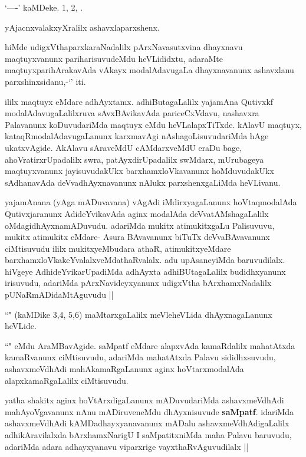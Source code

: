 \begin{artha}
`\stext----' kaMDeke. 1, 2, \stext.

yAjacnxvalakxyXralilx ashavxlaparxshenx.

hiMde udigxVthaparxkaraNadalilx pArxNavasutxvina dhayxnavu maqtuyxvanunx 
pariharisuvudeMdu heVLididxtu, adaraMte maqtuyxparihArakavAda vAkayx modalAdavugaLa 
dhayxnavanunx ashavxlanu parxshinxsidanu,-`\stext' iti.

ililx maqtuyx eMdare adhAyxtamx. adhiButagaLalilx yajamAna Qutivxkf 
modalAdavugaLalilxruva sAvxBAvikavAda pariceCxVdavu, nashavxra Palavanunx koDuvudariMda 
maqtuyx eMdu heVLalapxTiTxde. kAlavU maqtuyx, kataqRmodalAdavugaLanunx karxmavAgi 
nAshagoLisuvudariMda hAge ukatxvAgide. AkAlavu sAraveMdU cAMdarxveMdU eraDu bage, 
ahoVratirxrUpadalilx swra, patAyxdirUpadalilx swMdarx, mUrubageya maqtuyxvanunx 
jayisuvudakUkx barxhamxloVkavanunx hoMduvudakUkx sAdhanavAda deVvadhAyxnavanunx nAlukx 
parxshenxgaLiMda heVLivanu.
\end{artha}

\begin{center}
\end{center}

\begin{artha}
yajamAnana (yAga mADuvavana) vAgAdi iMdirxyagaLanunx hoVtaqmodalAda Qutivxjaranunx AdideYvikavAda aginx modalAda deVvatAMshagaLalilx oMdagidhAyxnamADuvudu. adariMda mukitx atimukitxgaLu Palisuvuvu, mukitx atimukitx eMdare- Asura BAvavanunx biTuTx deVvaBAvavanunx ciMtisuvudu ililx mukitxyeMbudara athaR, atimukitxyeMdare barxhamxloVkakeYvalalxveMdathaRvalalx. adu upAsaneyiMda baruvudilalx. hiVgeye AdhideYvikarUpadiMda adhAyxta adhiBUtagaLalilx budidhxyanunx irisuvudu, adariMda pArxNavideyxyanunx udigxVtha bArxhamxNadalilx pUNaRmADidaMtAguvudu ||
\end{artha}

\begin{artha}
``\stext" (kaMDike 3,4, 5,6) maMtarxgaLalilx meVleheVLida dhAyxnagaLanunx heVLide.
\end{artha}

\begin{center}
\end{center}

\begin{artha}
``\stext" eMdu AraMBavAgide. saMpatf eMdare alapxvAda kamaRdalilx mahatAtxda kamaRvanunx ciMtisuvudu, adariMda mahatAtxda Palavu sididhxsuvudu, ashavxmeVdhAdi mahAkamaRgaLanunx aginx hoVtarxmodalAda alapxkamaRgaLalilx ciMtisuvudu.

yatha shakitx aginx hoVtArxdigaLanunx mADuvudariMda ashavxmeVdhAdi mahAyoVgavanunx nAnu mADiruveneMdu dhAyxnisuvude \textbf{saMpatf}. idariMda ashavxmeVdhAdi kAMDadhayxyanavanunx mADalu ashavxmeVdhAdigaLalilx adhikAravilalxda bArxhamxNarigU I saMpatitxniMda maha Palavu baruvudu, adariMda adara adhayxyanavu viparxrige vayxthaRvAguvudilalx ||
\end{artha}

